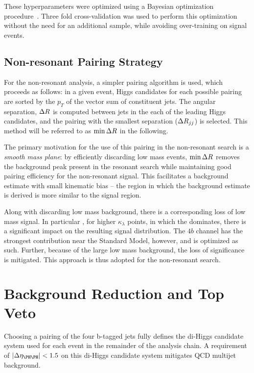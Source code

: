 These hyperparameters were optimized using a Bayesian optimization
procedure~\cite{skopt}. Three fold cross-validation was used to perform this
optimization without the need for an additional sample, while avoiding
over-training on signal events.

\subsection{Non-resonant Pairing Strategy}
For the non-resonant analysis, a simpler pairing algorithm is used, which 
proceeds as follows: in a given event, Higgs candidates for each possible pairing
are sorted by the $p_{T}$ of the vector sum of constituent jets. The angular separation,
$\Delta R$ is computed between jets in the each of the leading Higgs candidates, and the 
pairing with the smallest separation ($\Delta R_{jj}$) is selected. This method will be 
referred to as $\min{\ensuremath{\Delta R}}$ in the following.

The primary motivation for the use of this pairing in the non-resonant search is a 
\emph{smooth mass plane}: by efficiently discarding low mass events, $\min{\ensuremath{\Delta R}}$ removes 
the background peak present in the resonant search while maintaining good pairing 
efficiency for the non-resonant signal. This facilitates a background estimate with 
small kinematic bias -- the region in which the background estimate is derived is 
more similar to the signal region. 

Along with discarding low mass background, there is a corresponding loss of low mass signal.
In particular , for higher $\kappa_{\lambda}$ points, in which the 
 dominates, there is a significant impact 
on the resulting signal distribution.  The $4b$ channel 
has the strongest contribution near the Standard Model, however, and is optimized as such.
Further, because of the large low mass background, the loss of significance is mitigated.
This approach is thus adopted for the non-resonant search.


\section{Background Reduction and Top Veto}

Choosing a pairing of the four b-tagged jets fully defines the di-Higgs candidate system used for each event in the remainder of the analysis chain. A requirement of
$\abs{\Delta\eta_{\higgs\higgs}} < 1.5$ on this di-Higgs candidate system mitigates
QCD multijet background.

